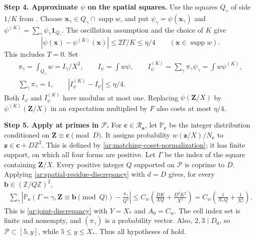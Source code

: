\documentclass[twoside]{aomart}
\makeatletter
\theoremstyle{paperplain}
\theoremstyle{paperdefinition}
\renewenvironment{proof}[1][\proofname]{\par\pushQED{\qed}%
  \normalfont\topsep6\p@\@plus3\p@\relax\trivlist
  \item[\hskip\labelsep\itshape #1\@addpunct{.}]\ignorespaces
}{\popQED\endtrivlist\@endpefalse}
\newcommand{\Z}{\mathbb Z}
\newcommand{\Pp}{\mathbb P}
\numberwithin{equation}{section}
\makeatother
\begin{document}
\begin{proof}
\par
\medskip
\noindent\textbf{Step 4. Approximate $\psi$ on the spatial squares.}
Use the squares $Q_\gamma$ of side $1/K$ from
. Choose
$\mathbf x_\gamma\in Q_\gamma\cap\operatorname{supp}w$, and put
$\psi_\gamma=\psi(\mathbf x_\gamma)$ and
$\displaystyle \psi^{(K)}=\sum_\gamma\psi_\gamma\mathbf1_{Q_\gamma}$.
The oscillation assumption and the choice of $K$ give
\begin{equation}
 |\psi(\mathbf x)-\psi^{(K)}(\mathbf x)|
 \le2T/K\le\eta/4
 \qquad(\mathbf x\in\operatorname{supp}w).
 \label{ar:phase-approximation}
\end{equation}
This includes $T=0$. Set
\begin{equation}
 \begin{gathered}
 \pi_\gamma=\int_{Q_\gamma}w=I_\gamma/X^2,
 \qquad I_\psi=\int w\psi,\qquad
 I_\psi^{(K)}=\sum_\gamma\pi_\gamma\psi_\gamma=\int w\psi^{(K)},\\
 \sum_\gamma\pi_\gamma=1,
 \qquad |I_\psi^{(K)}-I_\psi|\le\eta/4.
 \end{gathered}
 \label{ar:matching-spatial-integral}
\end{equation}
Both $I_\psi$ and $I_\psi^{(K)}$ have modulus at most one.
Replacing $\psi(\mathbf Z/X)$ by $\psi^{(K)}(\mathbf Z/X)$
in an expectation multiplied by $F$ also costs at most $\eta/4$.

\par
\medskip
\noindent\textbf{Step 5. Apply  at primes in $\mathcal P$.}
For $\mathbf c\in\mathcal R_{\mathbf a}$, let $\Pp_{\mathbf c}$
be the integer distribution conditioned on
$\mathbf Z\equiv\mathbf c\pmod D$.
It assigns probability $w(\mathbf z/X)/N_{\mathbf c}$ to
$\mathbf z\in\mathbf c+D\Z^2$.
This is defined by \eqref{ar:matching-coset-normalization}; it has
finite support, on which all four forms are positive.
Let $\Gamma$ be the index of the square containing $\mathbf Z/X$.
Every positive integer $Q$ supported on $\mathcal P$ is coprime to $D$.
Applying \eqref{ar:spatial-residue-discrepancy} with $d=D$ gives,
for every $\mathbf b\in(\Z/Q\Z)^2$,
\begin{equation*}
 \begin{aligned}
 \sum_\gamma\left|
 \Pp_{\mathbf c}(\Gamma=\gamma,\mathbf Z\equiv\mathbf b\pmod Q)
       -\frac{\pi_\gamma}{Q^2}\right|
 \le C_w\left(\frac{DK}{XQ}+\frac{D^2K^2}{X^2}\right)
 =C_w\left(\frac1{X_*Q}+\frac1{X_*^2}\right).
 \end{aligned}
 \end{equation*}
This is \eqref{ar:joint-discrepancy} with $Y=X_*$ and $A_0=C_w$.
The cell index set is finite and nonempty, and $(\pi_\gamma)$ is
a probability vector. Also, $2,3\mid D_0$, so
$\mathcal P\subset[5,y]$, while $5\le y\le X_*$.
Thus all hypotheses of  hold.


\end{proof}
\end{document}
